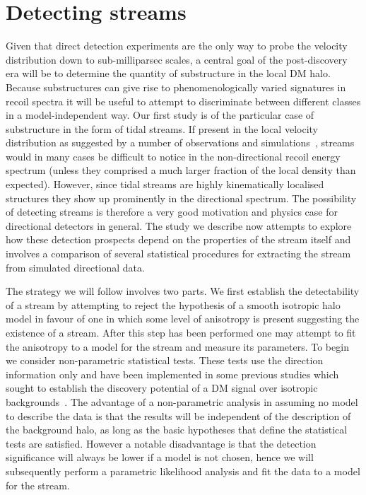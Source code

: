 \section{Detecting streams}\label{sec:directional_streams}
Given that direct detection experiments are the only way to probe the velocity distribution down to sub-milliparsec scales, a central goal of the post-discovery era will be to determine the quantity of substructure in the local DM halo. Because substructures can give rise to phenomenologically varied signatures in recoil spectra it will be useful to attempt to discriminate between different classes in a model-independent way. Our first study is of the particular case of substructure in the form of tidal streams. If present in the local velocity distribution as suggested by a number of observations and simulations~\cite{Newberg:2003cu,Yanny:2003zu,Majewski:2003ux,Purcell:2012sh,Luque:2016nsz}, streams would in many cases be difficult to notice in the non-directional recoil energy spectrum (unless they comprised a much larger fraction of the local density than expected). However, since tidal streams are highly kinematically localised structures they show up prominently in the directional spectrum. The possibility of detecting streams is therefore a very good motivation and physics case for directional detectors in general. The study we describe now attempts to explore how these detection prospects depend on the properties of the stream itself and involves a comparison of several statistical procedures for extracting the stream from simulated directional data.

The strategy we will follow involves two parts. We first establish the detectability of a stream by attempting to reject the hypothesis of a smooth isotropic halo model in favour of one in which some level of anisotropy is present suggesting the existence of a stream. After this step has been performed one may attempt to fit the anisotropy to a model for the stream and measure its parameters. To begin we consider non-parametric statistical tests. These tests use the direction information only and have been implemented in some previous studies which sought to establish the discovery potential of a DM signal over isotropic backgrounds~\cite{Morgan:2004ys, Green:2010zm}. The advantage of a non-parametric analysis in assuming no model to describe the data is that the results will be independent of the description of the background halo, as long as the basic hypotheses that define the statistical tests are satisfied. However a notable disadvantage is that the detection significance will always be lower if a model is not chosen, hence we will subsequently perform a parametric likelihood analysis and fit the data to a model for the stream.

